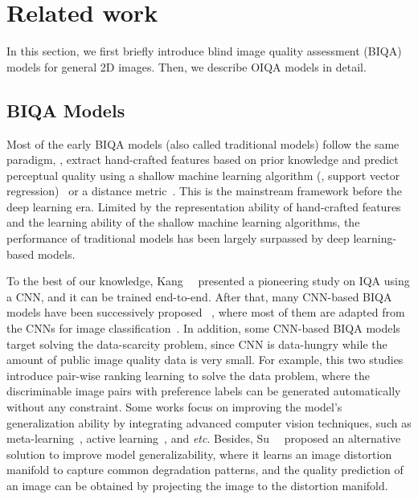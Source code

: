 \section{Related work}
\label{sec:rw}

In this section, we first briefly introduce blind image quality assessment (BIQA) models for general 2D images. Then, we describe OIQA models in detail.

\subsection{BIQA Models}

Most of the early BIQA models (also called traditional models) follow the same paradigm, \ie, extract hand-crafted features based on prior knowledge and predict perceptual quality using a shallow machine learning algorithm (\eg, support vector regression)~\cite{fang2017no} or a distance metric~\cite{mittal2012making}. This is the mainstream framework before the deep learning era. Limited by the representation ability of hand-crafted features and the learning ability of the shallow machine learning algorithms, the performance of traditional models has been largely surpassed by deep learning-based models.  

To the best of our knowledge, Kang~\et~\cite{kang2014convolutional} presented a pioneering study on IQA using a CNN, and it can be trained end-to-end. After that, many CNN-based BIQA models have been successively proposed ~\cite{kim2017deep,zhang2018blind,gu2019blind,su2020blindly}, where most of them are adapted from the CNNs for image classification~\cite{kim2017deep,zhang2018blind,gu2019blind,su2020blindly}. In addition, some CNN-based BIQA models target solving the data-scarcity problem, since CNN is data-hungry while the amount of public image quality data is very small. For example, this two studies~\cite {liu2017rankiqa, ma2017dipiq} introduce pair-wise ranking learning to solve the data problem, where the discriminable image pairs with preference labels can be generated automatically without any constraint. Some works focus on improving the model's generalization ability by integrating advanced computer vision techniques, such as meta-learning~\cite {zhu2020metaiqa}, active learning~\cite{wang2021active}, and \emph{etc}. Besides, Su~\et~\cite{su2023distortion} proposed an alternative solution to improve model generalizability, where it learns an image distortion manifold to capture common degradation patterns, and the quality prediction of an image can be obtained by projecting the image to the distortion manifold.

